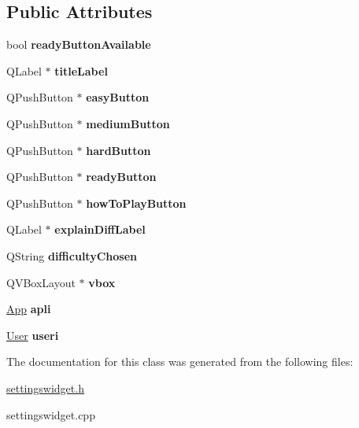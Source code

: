 \subsection*{Public Attributes}
\begin{DoxyCompactItemize}
\item 
\mbox{\label{classSettingsWidget_ae230be0cf35e7b7dafda138cfff40a6f}} 
bool {\bfseries ready\+Button\+Available}
\item 
\mbox{\label{classSettingsWidget_a22e199038772e7324eea3b43062f75b5}} 
Q\+Label $\ast$ {\bfseries title\+Label}
\item 
\mbox{\label{classSettingsWidget_a2b4015107c511f83d1eb180d61fdc967}} 
Q\+Push\+Button $\ast$ {\bfseries easy\+Button}
\item 
\mbox{\label{classSettingsWidget_a93fc5e9365a8a3f2a4ebc014585d0307}} 
Q\+Push\+Button $\ast$ {\bfseries medium\+Button}
\item 
\mbox{\label{classSettingsWidget_a6fde713cda8c16edf7842577bd716246}} 
Q\+Push\+Button $\ast$ {\bfseries hard\+Button}
\item 
\mbox{\label{classSettingsWidget_a71560e6adfd8309ef14e7b348f48ecca}} 
Q\+Push\+Button $\ast$ {\bfseries ready\+Button}
\item 
\mbox{\label{classSettingsWidget_a42ebfa8957550ca5e6b44a6be57a40ac}} 
Q\+Push\+Button $\ast$ {\bfseries how\+To\+Play\+Button}
\item 
\mbox{\label{classSettingsWidget_aa6a7618c40fdf60417fe356319a012dd}} 
Q\+Label $\ast$ {\bfseries explain\+Diff\+Label}
\item 
\mbox{\label{classSettingsWidget_a7d9dc29c16fd99cb20a2f7ac44ec56ad}} 
Q\+String {\bfseries difficulty\+Chosen}
\item 
\mbox{\label{classSettingsWidget_ae61202ba2dc23fe3708de9636accb807}} 
Q\+V\+Box\+Layout $\ast$ {\bfseries vbox}
\item 
\mbox{\label{classSettingsWidget_aff63073b97716c3cad0bdcd0ce994409}} 
\hyperlink{classApp}{App} {\bfseries apli}
\item 
\mbox{\label{classSettingsWidget_a6866a576cd8052710b7c14462a6cc7dc}} 
\hyperlink{classUser}{User} {\bfseries useri}
\end{DoxyCompactItemize}


The documentation for this class was generated from the following files\+:\begin{DoxyCompactItemize}
\item 
\hyperlink{settingswidget_8h}{settingswidget.\+h}\item 
settingswidget.\+cpp\end{DoxyCompactItemize}

